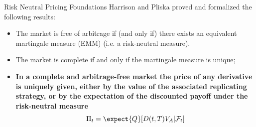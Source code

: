 \documentclass{beamer}
\begin{document}
	\begin{frame}{Risk Neutral Pricing Foundations}
		Harrison and Pliska proved and formalized the following results:
		\begin{itemize}
			\item The market is free of arbitrage if (and only if) there exists an \textcolor{maincolor}{equivalent martingale measure} (EMM) (i.e. a risk-neutral measure).
			\item The market is complete if and only if the martingale measure is unique;
			\item \textbf{In a complete and arbitrage-free market the price of any derivative is uniquely given, either by the value of the associated replicating strategy, or by the expectation of the discounted payoff under the risk-neutral measure}
			\begin{equation}
				\Pi_t = \expect{Q}[D(t,T)V_A|\mathcal{F}_t]
				\label{eq:risk_neutral_pricing}
			\end{equation}
		\end{itemize}
	\end{frame}
\end{document}
